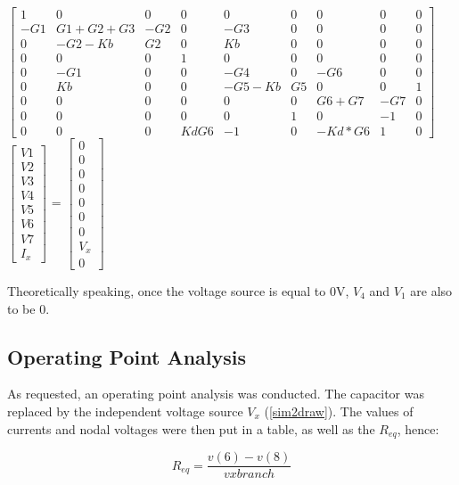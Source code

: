 $\begin{bmatrix}
1 & 0 & 0 & 0 & 0 & 0 & 0 & 0 & 0\\
-G1 & G1+G2+G3 & -G2 & 0 & -G3 & 0 & 0 & 0 & 0\\
0 & -G2-Kb & G2 & 0 & Kb & 0 & 0 & 0 & 0\\
0 & 0 & 0 & 1 & 0 & 0 & 0 & 0 & 0\\
0 & -G1 & 0 & 0 & -G4 & 0 & -G6 & 0 & 0\\
0 & Kb & 0 & 0 & -G5-Kb & G5 & 0 & 0 & 1\\
0 & 0 & 0 & 0 & 0 & 0 & G6+G7& -G7 & 0\\
0 & 0 & 0 & 0 & 0 & 1 & 0 & -1 & 0\\
0 & 0 & 0 & KdG6 & -1 & 0 & -Kd*G6 & 1 & 0
\end{bmatrix}$
$\begin{bmatrix}
V1 \\ V2 \\ V3 \\ V4 \\ V5 \\ V6 \\ V7 \\ I_{x}
\end{bmatrix}$
= 
$\begin{bmatrix}
0 \\ 0 \\ 0 \\ 0 \\ 0 \\ 0 \\ 0 \\ V_{x} \\ 0
\end{bmatrix}$

\par Theoretically speaking, once the voltage source is equal to 0V, $V_{4}$ and  $V_{1}$ are also to be 0. 


\subsection{Operating Point Analysis}
As requested, an operating point analysis was conducted. The capacitor was replaced by the independent voltage source $V_{x}$ (\ref{sim2draw}). The values of currents and nodal voltages  were then put in a table, as well as the $R_{eq}$, hence:

\begin{equation}
R_{eq}=\frac{v(6)-v(8)}{vxbranch}
\label{eq:4}
\end{equation}



